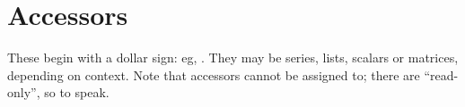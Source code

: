 \section{Accessors}
\label{sec:accessors}
 
These begin with a dollar sign: eg, . They may be series,
lists, scalars or matrices, depending on context. Note that accessors
cannot be assigned to; there are ``read-only'', so to speak.

